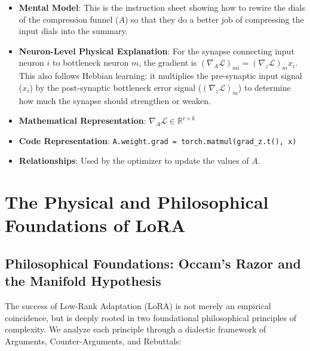 \documentclass{article}
\begin{document}
\begin{enumerate}
\begin{itemize}
\begin{center}
\begin{adjustbox}{max width=0.85\linewidth}
\begin{tikzpicture}[node distance=1.0cm and 1.5cm, scale=0.85, every node/.style={transform shape}]
\end{tikzpicture}
\end{adjustbox}
\vspace{1.5em}
\end{center}

      \item \textbf{Mental Model}: This is the instruction sheet showing how to rewire the dials of the compression funnel ($A$) so that they do a better job of compressing the input dials into the summary.
      \item \textbf{Neuron-Level Physical Explanation}: For the synapse connecting input neuron $i$ to bottleneck neuron $m$, the gradient is $(\nabla_A \mathcal{L})_{mi} = (\nabla_z \mathcal{L})_m x_i$. This also follows Hebbian learning: it multiplies the pre-synaptic input signal ($x_i$) by the post-synaptic bottleneck error signal ($(\nabla_z \mathcal{L})_m$) to determine how much the synapse should strengthen or weaken.
      \item \textbf{Mathematical Representation}: $\nabla_A \mathcal{L} \in \mathbb{R}^{r \times k}$
      \item \textbf{Code Representation}: \texttt{A.weight.grad = torch.matmul(grad\_z.t(), x)}
      \item \textbf{Relationships}: Used by the optimizer to update the values of $A$.
    \end{itemize}
\end{enumerate}

\section{The Physical and Philosophical Foundations of LoRA}

\subsection{Philosophical Foundations: Occam's Razor and the Manifold Hypothesis}
The success of Low-Rank Adaptation (LoRA) is not merely an empirical coincidence, but is deeply rooted in two foundational philosophical principles of complexity. We analyze each principle through a dialectic framework of Arguments, Counter-Arguments, and Rebuttals:
\end{document}
